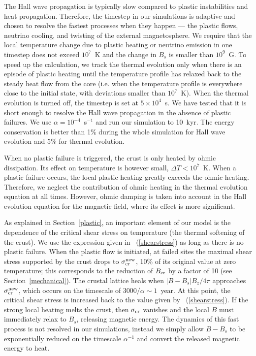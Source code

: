The Hall wave propagation is typically slow compared to plastic instabilities and heat propagation. 
Therefore, the timestep in our simulations is adaptive and chosen to resolve the fastest processes when they happen --- the plastic flows, neutrino cooling, and twisting of the external magnetosphere. 
We require that the local temperature change due to plastic heating or neutrino emission in one timestep does not exceed $10^7$~K and the change in $B_s$ is smaller than $10^{9}$~G. 
To speed up the calculation, we track the thermal evolution only when there is an episode of plastic heating until the temperature profile has relaxed back to the steady heat flow from the core (i.e. when the temperature profile is everywhere close to the initial state, with deviations smaller than $10^7$~K). 
When the thermal evolution is turned off, the timestep is set at $5\times 10^4$~s. 
We have tested that it is short enough to resolve the Hall wave propagation in the absence of plastic failures. 
We use $\alpha= 10^{-4}$~s$^{-1}$ and run our simulation to 10~kyr. 
The energy conservation is better than 1\% during the whole simulation for Hall wave evolution and 5\% for thermal evolution.


When no plastic failure is triggered, the crust is only heated by ohmic dissipation.
Its effect on temperature is however small, $\Delta T<10^7$~K. When a plastic failure occurs, the local plastic heating greatly exceeds the ohmic heating. 
Therefore, we neglect the contribution of ohmic heating in the thermal evolution equation at all times. 
However, ohmic damping is taken into account in the Hall evolution equation for the magnetic field, where its effect is more significant.

As explained in Section~\ref{plastic}, an important element of our model is the dependence of the critical shear stress on temperature (the thermal softening of the crust). 
We use the expression given in \Eq~(\ref{shearstress}) as long as there is no plastic failure. When the plastic flow is initiated, at failed sites the maximal shear stress supported by the crust drops to $\sigma_{\rm cr}^{\rm new}$, 10\% of its original value at zero temperature; this corresponds to the reduction of $B_{\rm cr}$ by a factor of 10 (see Section~\ref{mechanical}).
The crustal lattice heals when $|B-B_s|B_z/4\pi$ approaches $\sigma_{\rm cr}^{\rm new}$, which occurs on the timescale of $3000/\alpha\sim 1$~year. At this point, the critical shear stress is increased back to the value given by \Eq~(\ref{shearstress}).
If the strong local heating melts the crust, then $\sigma_{\rm cr}$ vanishes and the local $B$ must immediately relax to $B_s$, releasing magnetic energy. 
The dynamics of this fast process is not resolved in our simulations, instead we simply allow $B-B_s$ to be exponentially reduced on the timescale $\alpha^{-1}$ and convert the released magnetic energy to heat.

